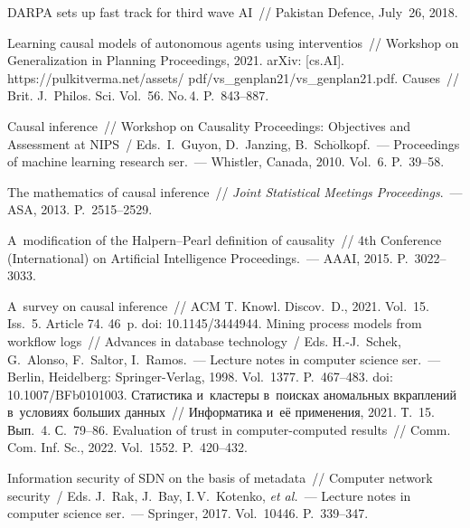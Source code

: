 \begin{multicols}{2}
{{\begin{thebibliography}{99}
DARPA sets up fast track for third wave AI~// Pakistan Defence, July~26, 2018.

 
 Learning causal models of autonomous agents using interventios~// Workshop on Generalization in Planning Proceedings,
 2021. \mbox{arXiv}: [cs.AI]. {\sf 
https://pulkitverma.net/assets/ pdf/vs\_genplan21/vs\_genplan21.pdf}.
 Causes~//
{Brit. J.~Philos. Sci.} Vol.~56. No.\,4. P.~843--887.

 Causal inference~// Workshop on Causality  Proceedings: Objectives and Assessment at NIPS~/ 
Eds.\ I.~Guyon, D.~Janzing, B.~Sch$\ddot{\mbox{o}}$lkopf.~--- 
Proceedings of machine learning research ser.~--- Whistler, Canada, 2010. Vol.~6. P.~39--58. 

 The mathematics of causal inference~// \textit{Joint Statistical Meetings 
Proceedings}.~--- ASA, 2013. P.~2515--2529.

 A~modification of the Halpern--Pearl definition of causality~// 4th 
Conference (International) on Artificial Intelligence Proceedings.~--- AAAI, 2015. P.~3022--3033. 


 A~survey on causal inference~// ACM T. Knowl. 
Discov.~D., 2021. Vol.~15. Iss.~5. Article 74. 46~p. doi: 10.1145/3444944.
 Mining process models from workflow logs~// 
Advances in database technology~/ Eds. H.-J.~Schek, G.~Alonso, F.~Saltor, I.~Ramos.~--- Lecture 
notes in computer science ser.~--- Berlin, Heidelberg: Springer-Verlag, 1998. Vol.~1377. P.~467--483. 
doi: 10.1007/BFb0101003.
Статистика и~кластеры в~поисках аномальных вкраплений в~условиях больших данных~// 
Информатика и~её применения, 2021. Т.~15. Вып.~4. С.~79--86.
 Evaluation of trust in computer-computed 
results~// Comm. Com. Inf. Sc., 2022. Vol.~1552. P.~420--432.

 Information security of 
SDN on the basis of metadata~// Computer network security~/ Eds. J.~Rak, J.~Bay, I.\,V.~Kotenko, 
\textit{et al.}~--- Lecture notes in computer science ser.~--- Springer, 2017. Vol.~10446. P.~339--347. 


\end{thebibliography}}}
\end{multicols}
